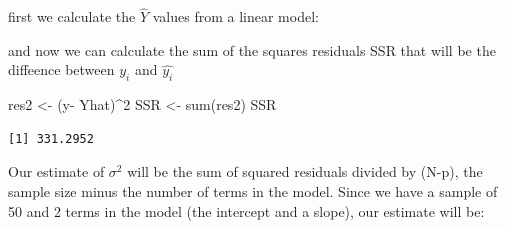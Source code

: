\documentclass[
  letterpaper,
  DIV=11,
  numbers=noendperiod]{scrartcl}
\newenvironment{Shaded}{\begin{snugshade}}{\end{snugshade}}
\newcommand{\DecValTok}[1]{\textcolor[rgb]{0.68,0.00,0.00}{#1}}
\newcommand{\FunctionTok}[1]{\textcolor[rgb]{0.28,0.35,0.67}{#1}}
\newcommand{\NormalTok}[1]{\textcolor[rgb]{0.00,0.23,0.31}{#1}}
\newcommand{\OtherTok}[1]{\textcolor[rgb]{0.00,0.23,0.31}{#1}}
\newcommand{\SpecialCharTok}[1]{\textcolor[rgb]{0.37,0.37,0.37}{#1}}
\begin{document}
\begin{Shaded}
\end{Shaded}

first we calculate the \(\hat{Y}\) values from a linear model:

\begin{Shaded}
\end{Shaded}

and now we can calculate the sum of the squares residuals SSR that will
be the diffeence between \(y_i\) and \(\hat{y_i}\)

\begin{Shaded}
\begin{Highlighting}[]
\NormalTok{res2 }\OtherTok{\textless{}{-}}\NormalTok{ (y}\SpecialCharTok{{-}}\NormalTok{ Yhat)}\SpecialCharTok{\^{}}\DecValTok{2}
\NormalTok{SSR }\OtherTok{\textless{}{-}} \FunctionTok{sum}\NormalTok{(res2)}
\NormalTok{SSR}
\end{Highlighting}
\end{Shaded}

\begin{verbatim}
[1] 331.2952
\end{verbatim}

Our estimate of \(\sigma^2\) will be the sum of squared residuals
divided by (N-p), the sample size minus the number of terms in the
model. Since we have a sample of 50 and 2 terms in the model (the
intercept and a slope), our estimate will be:
\end{document}
